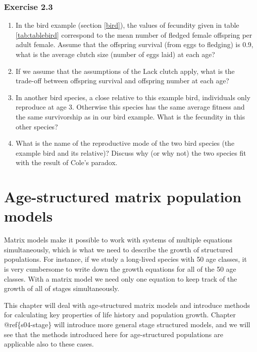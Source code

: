 \documentclass[
]{book}
\begin{document}
\hypertarget{exercise-2.3}{%
\subsection*{Exercise 2.3}\label{exercise-2.3}}

\begin{enumerate}
\def\labelenumi{\arabic{enumi}.}
\item
  In the bird example (section \ref{bird}), the values of fecundity given in table \ref{tab:tablebird} correspond to the mean number of fledged female offspring per adult female. Assume that the offspring survival (from eggs to fledging) is 0.9, what is the average clutch size (number of eggs laid) at each age?
\item
  If we assume that the assumptions of the Lack clutch apply, what is the trade-off between offspring survival and offspring number at each age?
\item
  In another bird species, a close relative to this example bird, individuals only reproduce at age 3. Otherwise this species has the same average fitness and the same survivorship as in our bird example. What is the fecundity in this other species?
\item
  What is the name of the reproductive mode of the two bird species (the example bird and its relative)? Discuss why (or why not) the two species fit with the result of Cole's paradox.
\end{enumerate}

\hypertarget{s03-MatrixModels}{%
\chapter{Age-structured matrix population models}\label{s03-MatrixModels}}

Matrix models make it possible to work with systems of multiple equations simultaneously, which is what we need to describe the growth of structured populations. For instance, if we study a long-lived species with 50 age classes, it is very cumbersome to write down the growth equations for all of the 50 age classes. With a matrix model we need only one equation to keep track of the growth of all of stages simultaneously.

This chapter will deal with age-structured matrix models and introduce methods for calculating key properties of life history and population growth. Chapter @ref\{s04-stage\} will introduce more general stage structured models, and we will see that the methods introduced here for age-structured populations are applicable also to these cases.
\end{document}
